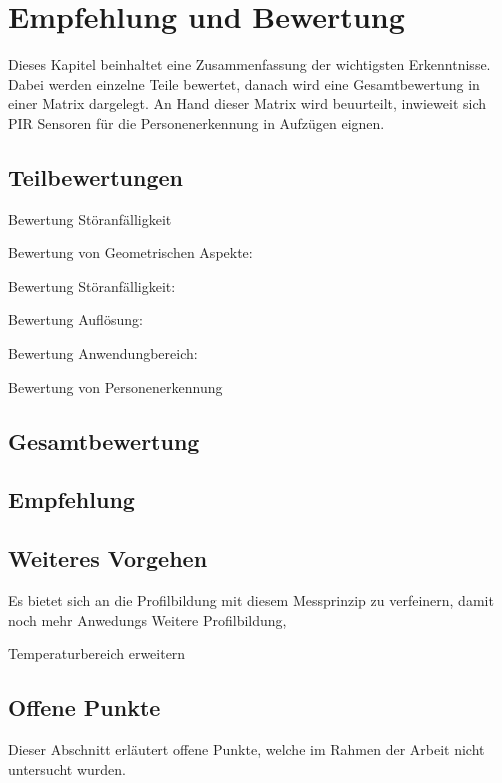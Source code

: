 \chapter{Empfehlung und Bewertung}
\label{Empfehlung_Vorgehen}

Dieses Kapitel beinhaltet eine Zusammenfassung der wichtigsten Erkenntnisse. Dabei werden einzelne Teile bewertet, danach wird eine Gesamtbewertung in einer Matrix dargelegt. An Hand dieser Matrix wird beuurteilt, inwieweit sich PIR Sensoren für die Personenerkennung in Aufzügen eignen. 

\section{Teilbewertungen}
\label{sec:Teilbewertung}

Bewertung Störanfälligkeit


Bewertung von Geometrischen Aspekte:
		
		
Bewertung Störanfälligkeit:


Bewertung Auflösung:


Bewertung Anwendungbereich:




Bewertung von Personenerkennung

\section{Gesamtbewertung}
\label{sec:Gesamtbewetung}




\section{Empfehlung}
\label{sec:Empfehlung}



\section{Weiteres Vorgehen}

Es bietet sich an die Profilbildung mit diesem Messprinzip zu verfeinern, damit noch mehr Anwedungs
Weitere Profilbildung, 

Temperaturbereich erweitern

\section{Offene Punkte}

Dieser Abschnitt erläutert offene Punkte, welche im Rahmen der Arbeit nicht untersucht wurden.

